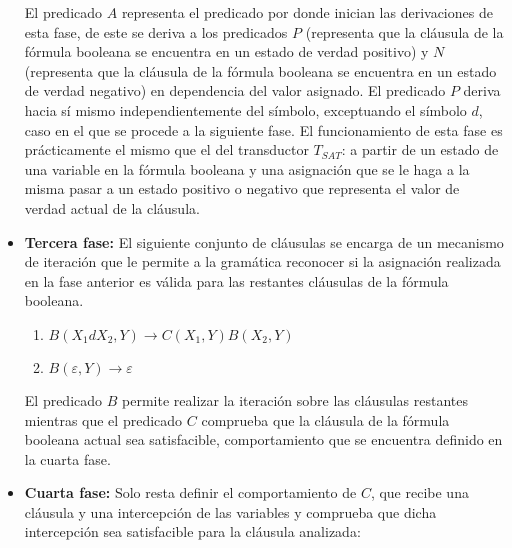 \documentclass[12pt]{article}
\begin{document}
\begin{itemize}
          El predicado $A$ representa el predicado por donde inician las derivaciones de esta fase, de este se
          deriva a los predicados $P$ (representa que la cláusula de la fórmula booleana se encuentra en un
          estado de verdad positivo) y $N$ (representa que la cláusula de la fórmula booleana se encuentra en
          un estado de verdad negativo) en dependencia del valor asignado. El predicado $P$ deriva hacia sí
          mismo independientemente del símbolo, exceptuando el símbolo $d$, caso en el que se procede a la
          siguiente fase.  El funcionamiento de esta fase es prácticamente el mismo que el del transductor
          $T_{SAT}$: a partir de un estado de una variable en la fórmula booleana y una asignación que se le
          haga a la misma pasar a un estado positivo o negativo que representa el valor de verdad actual de la
          cláusula.

    \item \textbf{Tercera fase:} El siguiente conjunto de cláusulas se encarga de un mecanismo de iteración que
          le permite a la gramática reconocer si la asignación realizada en la fase anterior es válida para las restantes
          cláusulas de la fórmula booleana.
          \begin{enumerate}[start=21]
              \item $B(X_1dX_2,Y)\to C(X_1,Y) B(X_2,Y)$
              \item $B(\varepsilon,Y)\to\varepsilon$
          \end{enumerate}

          El predicado $B$ permite realizar la iteración sobre las cláusulas restantes mientras que el
          predicado $C$ comprueba que la cláusula de la fórmula booleana actual sea satisfacible, comportamiento
          que se encuentra definido en la cuarta fase.

    \item \textbf{Cuarta fase:} Solo resta definir el comportamiento de $C$, que recibe una cláusula y una intercepción
          de las variables y comprueba que dicha intercepción sea satisfacible para la cláusula analizada:
          \begin{enumerate}[start=23]
\end{enumerate}
\end{itemize}
\end{document}
